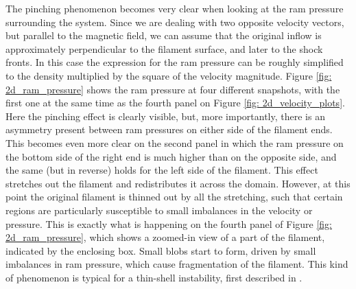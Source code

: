 The pinching phenomenon becomes very clear when looking at the ram pressure surrounding the system. Since we are dealing with two opposite velocity vectors, but parallel to the magnetic field, we can assume that the original inflow is approximately perpendicular to the filament surface, and later to the shock fronts. In this case the expression for the ram pressure can be roughly simplified to the density multiplied by the square of the velocity magnitude. Figure \ref{fig: 2d_ram_pressure} shows the ram pressure at four different snapshots, with the first one at the same time as the fourth panel on Figure \ref{fig: 2d_velocity_plots}. Here the pinching effect is clearly visible, but, more importantly, there is an asymmetry present between ram pressures on either side of the filament ends. This becomes even more clear on the second panel in which the ram pressure on the bottom side of the right end is much higher than on the opposite side, and the same (but in reverse) holds for the left side of the filament. This effect stretches out the filament and redistributes it across the domain. However, at this point the original filament is thinned out by all the stretching, such that certain regions are particularly susceptible to small imbalances in the velocity or pressure. This is exactly what is happening on the fourth panel of Figure \ref{fig: 2d_ram_pressure}, which shows a zoomed-in view of a part of the filament, indicated by the enclosing box. Small blobs start to form, driven by small imbalances in ram pressure, which cause fragmentation of the filament. This kind of phenomenon is typical for a thin-shell instability, first described in \citet{vishniac1983}.

